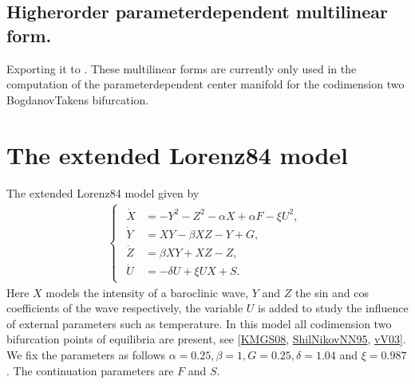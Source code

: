 \documentclass[letterpaper,10pt,english]{jupyterBook}
\begin{document}
\section{Higher\sphinxhyphen{}order parameter\sphinxhyphen{}dependent multi\sphinxhyphen{}linear form.}
\label{\detokenize{Lorenz84GenSym:higher-order-parameter-dependent-multi-linear-form}}
\sphinxAtStartPar
Exporting it to . These multi\sphinxhyphen{}linear forms are
currently only used in the computation of the parameter\sphinxhyphen{}dependent center
manifold for the codimension two Bogdanov\sphinxhyphen{}Takens bifurcation.

\begin{sphinxVerbatim}[commandchars=\\\{\}]
\PYG{p}{[}\PYG{p}{]}
\end{sphinxVerbatim}


\chapter{The extended Lorenz\sphinxhyphen{}84 model}
\label{\detokenize{extendedLorenz84model:the-extended-lorenz-84-model}}\label{\detokenize{extendedLorenz84model::doc}}
\sphinxAtStartPar
The extended Lorenz\sphinxhyphen{}84 model given by
\begin{equation}\label{equation:extendedLorenz84model:eq:Lorenz84}
\begin{split}\begin{cases}
\begin{aligned}
\dot{X} &=-Y^{2}-Z^{2}-\alpha X+\alpha F-\xi U^{2}, \\
\dot{Y} &=X Y-\beta X Z-Y+G, \\
\dot{Z} &=\beta X Y+X Z-Z, \\
\dot{U} &=-\delta U+\xi U X+S.
\end{aligned}
\end{cases}\end{split}
\end{equation}
\sphinxAtStartPar
Here \(X\) models the intensity of a baroclinic wave, \(Y\) and \(Z\) the sin and cos
coefficients of the wave respectively, the variable \(U\) is added to study the
influence of external parameters such as temperature.  In this model all
codimension two bifurcation points of equilibria are present, see
{[}\hyperlink{cite.references:id15}{KMGS08}, \hyperlink{cite.references:id17}{ShilNikovNN95}, \hyperlink{cite.references:id16}{vV03}{]}.  We fix the parameters as
follows \(\alpha=0.25, \beta=1, G=0.25, \delta=1.04\) and \(\xi=0.987\). The
continuation parameters are \(F\) and \(S\).
\end{document}
